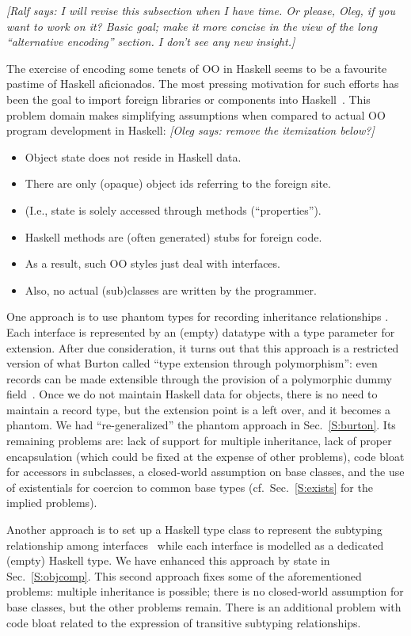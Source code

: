 \documentclass{jfp}
\newcommand{\oleg}[1]{{\it [Oleg says: #1]}}
\newcommand{\ralf}[1]{{\it [Ralf says: #1]}}
\newcommand{\noskip}{\topsep0pt \parskip0pt \partopsep0pt}
\begin{document}
\ralf{I will revise this subsection when I have time.
Or please, Oleg, if you want to work on it?
Basic goal; make it more concise in the view of the long
``alternative encoding'' section. I don't see any new insight.}

The exercise of encoding some tenets of OO in Haskell seems to be a
favourite pastime of Haskell aficionados. The most pressing motivation
for such efforts has been the goal to import foreign libraries or
components into Haskell~\cite{FLMPJ99,SPJ01,PC04}. This problem domain
makes simplifying assumptions when compared to actual OO program
development in Haskell:
\oleg{remove the itemization below?}

\begin{itemize}\noskip
\item Object state does not reside in Haskell data.
\item There are only (opaque) object ids referring to the foreign site.
\item (I.e., state is solely accessed through methods (``properties'').
\item Haskell methods are (often generated) stubs for foreign code.
\item As a result, such OO styles just deal with interfaces.
\item Also, no actual (sub)classes are written by the programmer.
\end{itemize}

One approach is to use phantom types for recording inheritance
relationships \cite{FLMPJ99}. Each interface is represented by an
(empty) datatype with a type parameter for extension. After due
consideration, it turns out that this approach is a restricted version
of what Burton called ``type extension through polymorphism'': even
records can be made extensible through the provision of a polymorphic
dummy field~\cite{Burton90}. Once we do not maintain Haskell data for
objects, there is no need to maintain a record type, but the extension
point is a left over, and it becomes a phantom. We had
``re-generalized'' the phantom approach in Sec.~\ref{S:burton}. Its
remaining problems are: lack of support for multiple inheritance, lack
of proper encapsulation (which could be fixed at the expense of other
problems), code bloat for accessors in subclasses, a closed-world
assumption on base classes, and the use of existentials for coercion
to common base types (cf.\ Sec.~\ref{S:exists} for the implied problems).

Another approach is to set up a Haskell type class to represent the
subtyping relationship among interfaces~\cite{SPJ01,PC04} while each
interface is modelled as a dedicated (empty) Haskell type. We have
enhanced this approach by state in Sec.~\ref{S:objcomp}. This second
approach fixes some of the aforementioned problems: multiple
inheritance is possible; there is no closed-world assumption for base
classes, but the other problems remain. There is an additional problem
with code bloat related to the expression of transitive subtyping
relationships.
\end{document}
